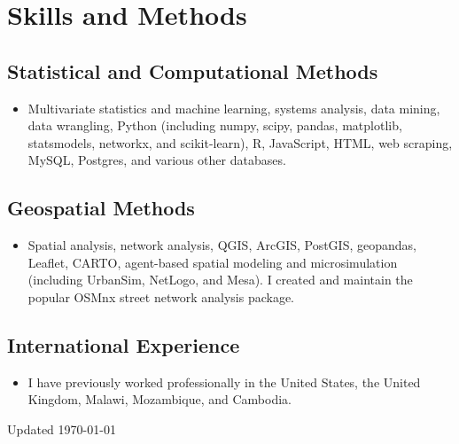 \documentclass{academiccv}
\begin{document}
\section*{Skills and Methods}

\subsection*{Statistical and Computational Methods}

\begin{itemize}
	
\item Multivariate statistics and machine learning, systems analysis, data mining, data wrangling, Python (including numpy, scipy, pandas, matplotlib, statsmodels, networkx, and scikit-learn), R, JavaScript, HTML, web scraping, MySQL, Postgres, and various other databases.

\end{itemize}

\subsection*{Geospatial Methods}

\begin{itemize}

\item Spatial analysis, network analysis, QGIS, ArcGIS, PostGIS, geopandas, Leaflet, CARTO, agent-based spatial modeling and microsimulation (including UrbanSim, NetLogo, and Mesa). I created and maintain the popular OSMnx street network analysis package.

\end{itemize}

\subsection*{International Experience}

\begin{itemize}
	
\item I have previously worked professionally in the United States, the United Kingdom, Malawi, Mozambique, and Cambodia.

\end{itemize}



\begin{center}
\vspace{6em}
Updated \monthyeardate\today
\end{center}
\end{document}

